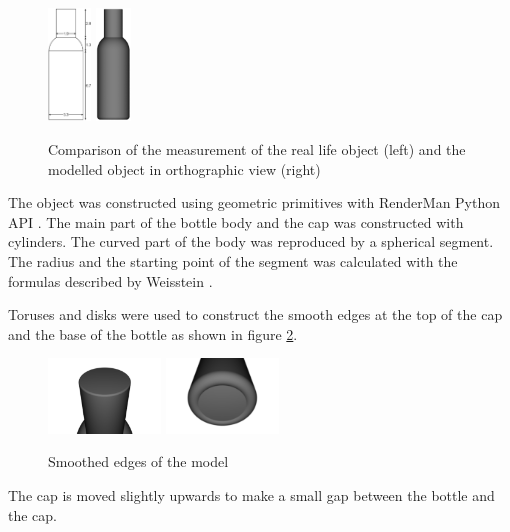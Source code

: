 \begin{figure}[htbp]
    \includegraphics[height=3cm]{imgs/measurement.png}
    \hspace{1cm}
    \includegraphics[height=3cm]{imgs/model_ortho.png}
    \caption{Comparison of the measurement of the real life object (left) and the modelled object in orthographic view (right)}
    \label{fig:measurement}
\end{figure}

The object was constructed using geometric primitives with RenderMan Python API \cite{pixar2022}.
The main part of the bottle body and the cap was constructed with cylinders.
The curved part of the body was reproduced by a spherical segment. The radius and the starting point of the segment was calculated with the formulas described by Weisstein .

Toruses and disks were used to construct the smooth edges at the top of the cap and the base of the bottle as shown in figure \ref{fig:model}.

\begin{figure}[htbp]
    \includegraphics[width=3cm]{imgs/model_top.png}
    \includegraphics[width=3cm]{imgs/model_bottom.png}
    \caption{Smoothed edges of the model}
    \label{fig:model}
\end{figure}

The cap is moved slightly upwards to make a small gap between the bottle and the cap.

